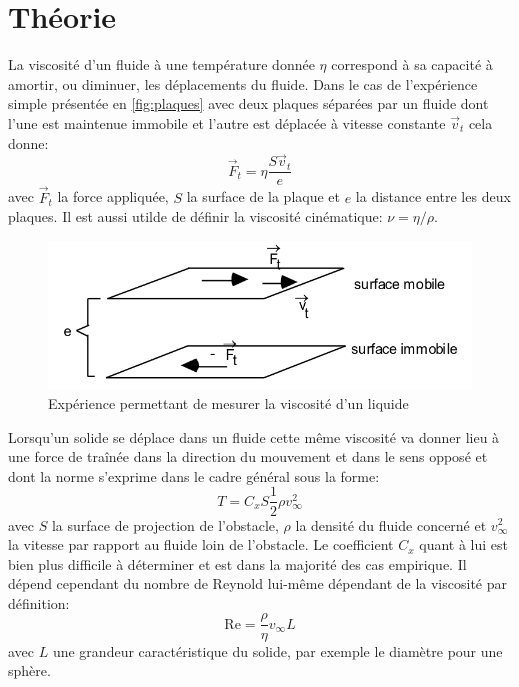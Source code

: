 \section{Théorie}
La viscosité d'un fluide à une température donnée $\eta$ correspond à sa capacité à amortir, ou diminuer, les déplacements du fluide. Dans le cas de l'expérience simple présentée en \autoref{fig:plaques} avec deux plaques séparées par un fluide dont l'une est maintenue immobile et l'autre est déplacée à vitesse constante $\vec{v}_t$ cela donne:
\begin{equation}
    \vec{F}_t = \eta \frac{S\vec{v}_t}{e}
\end{equation} 
avec $\vec{F}_t$ la force appliquée, $S$ la surface de la plaque et $e$ la distance entre les deux plaques. Il est aussi utilde de définir la viscosité cinématique: $\nu = \eta/\rho$.

\begin{figure}[h]
    \centering
    \includegraphics[width=0.6\linewidth]{figures/viscosite_plaques.png}
    \caption{Expérience permettant de mesurer la viscosité d'un liquide \cite{notice}}
    \label{fig:plaques}
\end{figure}

Lorsqu'un solide se déplace dans un fluide cette même viscosité va donner lieu à une force de traînée dans la direction du mouvement et dans le sens opposé et dont la norme s'exprime dans le cadre général sous la forme:
\begin{equation}
    T = C_x S \frac{1}{2} \rho v_\infty ^2
    \label{eq:trainee_gen}
\end{equation}
avec $S$ la surface de projection de l'obstacle, $\rho$ la densité du fluide concerné et \(v_\infty ^2\) la vitesse par rapport au fluide loin de l'obstacle. Le coefficient $C_x$ quant à lui est bien plus difficile à déterminer et est dans la majorité des cas empirique. Il dépend cependant du nombre de Reynold lui-même dépendant de la viscosité par définition:
\begin{equation}
    \mathrm{Re} = \frac{\rho}{\eta}v_\infty L
    \label{eq:Reynolds}
\end{equation}
avec $L$ une grandeur caractéristique du solide, par exemple le diamètre pour une sphère.

